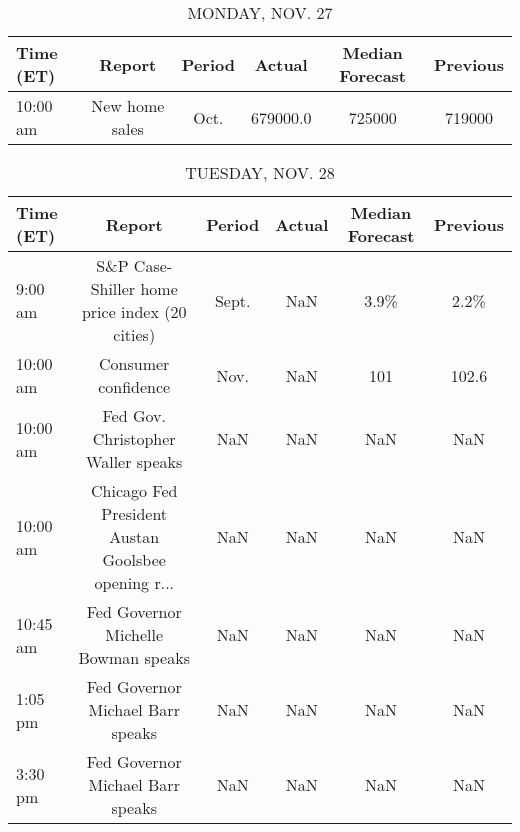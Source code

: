 \documentclass{article}%
\begin{document}
%
\normalsize%


\begin{table}[htbp]%
\caption{MONDAY, NOV. 27}%
\centering%
\begin{adjustbox}{width=1\textwidth}%
\begin{tabular}{lccccc}
\toprule
Time (ET) &         Report & Period &    Actual & Median Forecast & Previous \\
\midrule
 10:00 am & New home sales &   Oct. &  679000.0 &          725000 &   719000 \\
\bottomrule
\end{tabular}
%
\end{adjustbox}%
\end{table}

%


\begin{table}[htbp]%
\caption{TUESDAY, NOV. 28}%
\centering%
\begin{adjustbox}{width=1\textwidth}%
\begin{tabular}{lccccc}
\toprule
Time (ET) &                                             Report & Period & Actual & Median Forecast & Previous \\
\midrule
  9:00 am &      S\&P Case-Shiller home price index (20 cities) &  Sept. &    NaN &            3.9\% &     2.2\% \\
 10:00 am &                                Consumer confidence &   Nov. &    NaN &             101 &    102.6 \\
 10:00 am &                 Fed Gov. Christopher Waller speaks &    NaN &    NaN &             NaN &      NaN \\
 10:00 am & Chicago Fed President Austan Goolsbee opening r... &    NaN &    NaN &             NaN &      NaN \\
 10:45 am &                Fed Governor Michelle Bowman speaks &    NaN &    NaN &             NaN &      NaN \\
  1:05 pm &                   Fed Governor Michael Barr speaks &    NaN &    NaN &             NaN &      NaN \\
  3:30 pm &                   Fed Governor Michael Barr speaks &    NaN &    NaN &             NaN &      NaN \\
\bottomrule
\end{tabular}
%
\end{adjustbox}%
\end{table}

%
\end{document}
